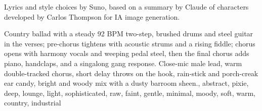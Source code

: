 

\begin{notes}
Lyrics and style choices by Suno, based on a summary by Claude of characters developed by Carlos Thompson for IA image generation.
\end{notes}

\begin{style}
Country ballad with a steady 92 BPM two-step, brushed drums and steel guitar in the verses; pre-chorus tightens with acoustic strums and a rising fiddle; chorus opens with harmony vocals and weeping pedal steel, then the final chorus adds piano, handclaps, and a singalong gang response. %
Close-mic male lead, warm double-tracked chorus, short delay throws on the hook, rain-stick and porch-creak ear candy, bright and woody mix with a dusty barroom sheen., abstract, pixie, deep, lounge, light, sophisticated, raw, faint, gentle, minimal, moody, soft, warm, country, industrial
\end{style}

